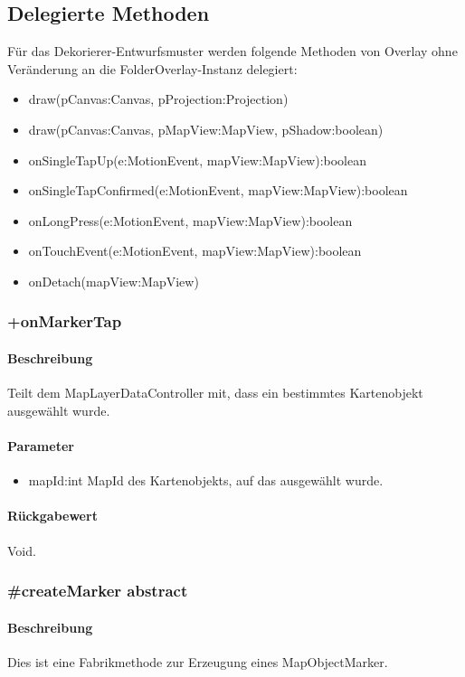\subsection{Delegierte Methoden}
Für das Dekorierer-Entwurfsmuster werden folgende Methoden von Overlay ohne Veränderung 
an die FolderOverlay-Instanz delegiert:
\begin{itemize}
    \item draw(pCanvas:Canvas, pProjection:Projection)
    \item draw(pCanvas:Canvas, pMapView:MapView, pShadow:boolean)
    \item onSingleTapUp(e:MotionEvent, mapView:MapView):boolean
    \item onSingleTapConfirmed(e:MotionEvent, mapView:MapView):boolean
    \item onLongPress(e:MotionEvent, mapView:MapView):boolean
    \item onTouchEvent(e:MotionEvent, mapView:MapView):boolean
    \item onDetach(mapView:MapView)
\end{itemize}

\subsubsection{+onMarkerTap}%
\paragraph*{Beschreibung}
Teilt dem MapLayerDataController mit, dass ein bestimmtes Kartenobjekt ausgewählt wurde.
\paragraph*{Parameter}
\begin{itemize}
    \item mapId:int MapId des Kartenobjekts, auf das ausgewählt wurde.
\end{itemize}
\paragraph*{Rückgabewert}
Void.

\subsubsection{#createMarker {abstract}}%
\paragraph*{Beschreibung}
Dies ist eine Fabrikmethode zur Erzeugung eines MapObjectMarker.
